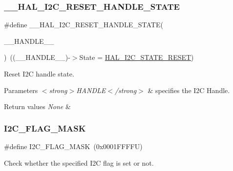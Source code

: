\subsubsection{\texorpdfstring{\_\_HAL\_I2C\_RESET\_HANDLE\_STATE}{\_\_HAL\_I2C\_RESET\_HANDLE\_STATE}}
{\footnotesize\ttfamily \#define \+\_\+\+\_\+\+H\+A\+L\+\_\+\+I2\+C\+\_\+\+R\+E\+S\+E\+T\+\_\+\+H\+A\+N\+D\+L\+E\+\_\+\+S\+T\+A\+TE(\begin{DoxyParamCaption}\item[{}]{\+\_\+\+\_\+\+H\+A\+N\+D\+L\+E\+\_\+\+\_\+ }\end{DoxyParamCaption})~((\+\_\+\+\_\+\+H\+A\+N\+D\+L\+E\+\_\+\+\_\+)-\/$>$State = \mbox{\hyperlink{group___h_a_l__state__structure__definition_ggaef355af8eab251ae2a19ee164ad81c37a91ba08634e08d7287940f1bc5a37eeff}{H\+A\+L\+\_\+\+I2\+C\+\_\+\+S\+T\+A\+T\+E\+\_\+\+R\+E\+S\+ET}})}



Reset I2C handle state. 


\begin{DoxyParams}{Parameters}
{\em $<$strong$>$\+H\+A\+N\+D\+L\+E$<$/strong$>$} & specifies the I2C Handle. \\
\hline
\end{DoxyParams}

\begin{DoxyRetVals}{Return values}
{\em None} & \\
\hline
\end{DoxyRetVals}
\mbox{\label{group___i2_c___exported___macros_gafbc0a6e4113be03100fbae1314a8b395}} 
\subsubsection{\texorpdfstring{I2C\_FLAG\_MASK}{I2C\_FLAG\_MASK}}
{\footnotesize\ttfamily \#define I2\+C\+\_\+\+F\+L\+A\+G\+\_\+\+M\+A\+SK~(0x0001\+F\+F\+F\+F\+U)}



Check whether the specified I2C flag is set or not. 


